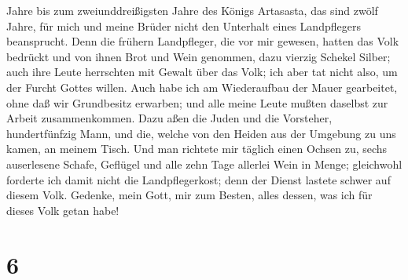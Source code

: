 Jahre bis zum zweiunddreißigsten Jahre des Königs Artasasta, das sind
zwölf Jahre, für mich und meine Brüder nicht den Unterhalt eines
Landpflegers beansprucht.  Denn die frühern Landpfleger,
die vor mir gewesen, hatten das Volk bedrückt und von ihnen Brot und
Wein genommen, dazu vierzig Schekel Silber; auch ihre Leute herrschten
mit Gewalt über das Volk; ich aber tat nicht also, um der Furcht Gottes
willen.  Auch habe ich am Wiederaufbau der Mauer
gearbeitet, ohne daß wir Grundbesitz erwarben; und alle meine Leute
mußten daselbst zur Arbeit zusammenkommen.  Dazu aßen die
Juden und die Vorsteher, hundertfünfzig Mann, und die, welche von den
Heiden aus der Umgebung zu uns kamen, an meinem Tisch. 
Und man richtete mir täglich einen Ochsen zu, sechs auserlesene Schafe,
Geflügel und alle zehn Tage allerlei Wein in Menge; gleichwohl forderte
ich damit nicht die Landpflegerkost; denn der Dienst lastete schwer auf
diesem Volk.  Gedenke, mein Gott, mir zum Besten, alles
dessen, was ich für dieses Volk getan habe!

\hypertarget{section-5}{%
\section{6}\label{section-5}}

